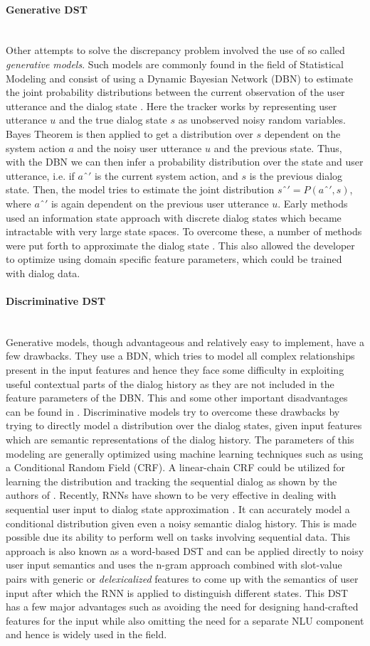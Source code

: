 \documentclass[12pt]{extarticle}
\newcommand{\myparagraph}[1]{\paragraph{#1}\mbox{}\\ \linebreak}
\numberwithin{equation}{section}
\begin{document}
	\myparagraph{Generative DST}
	Other attempts to solve the discrepancy problem involved the use of so called \textit{generative models}. Such models are commonly found in the field of Statistical Modeling and consist of using a Dynamic Bayesian Network (DBN) to estimate the joint probability distributions between the current observation of the user utterance and the dialog state \cite{Young_dst_dbn}. Here the tracker works by representing user utterance $u$ and the true dialog state $s$ as unobserved noisy random variables. Bayes Theorem is then applied to get a distribution over $s$ dependent on the system action $a$ and the noisy user utterance $u$ and the previous state. Thus, with the DBN we can then infer a probability distribution over the state and user utterance, i.e. if $aˆ'$ is the current system action, and $s$ is the previous dialog state. Then, the model tries to estimate the joint distribution $sˆ' = P(aˆ',s)$, where $aˆ'$ is again dependent on the previous user utterance $u$. Early methods used an information state approach with discrete dialog states\cite{roy2000spoken} which became intractable with very large state spaces. To overcome these, a number of methods were put forth to approximate the dialog state \cite{Henderson:2008:MMP:1557690.1557710}\cite{Young:2010:HIS:1621140.1621240}. This also allowed the developer to optimize using domain specific feature parameters, which could be trained with dialog data.
	\myparagraph{Discriminative DST}	
	Generative models, though advantageous and relatively easy to implement, have a few drawbacks.  They use a BDN, which tries to model all complex relationships present in the input features and hence they face some difficulty in exploiting useful contextual parts of the dialog history as they are not included in the feature parameters of the DBN. This and some other important disadvantages can be found in \cite{generative_dst_limitation}. Discriminative models try to overcome these drawbacks by trying to directly model a distribution over the dialog states, given input features which are semantic representations of the dialog history. The parameters of this modeling are generally optimized using machine learning techniques such as using a Conditional Random Field (CRF). A linear-chain CRF could be utilized for learning the distribution and tracking the sequential dialog as shown by the authors of \cite{Lee2013StructuredDM}. Recently, RNNs have shown to be very effective in dealing with sequential user input to dialog state approximation \cite{Henderson2014WordBasedDS}\cite{Henderson_dst_2014}. It can accurately model a conditional distribution given even a noisy semantic dialog history. This is made possible due its ability to perform well on tasks involving sequential data. This approach is also known as a word-based DST and can be applied directly to noisy user input semantics and uses the n-gram approach combined with slot-value pairs with generic or \textit{delexicalized} features to come up with the semantics of user input after which the RNN is applied to distinguish different states\cite{DBLP:journals/corr/MrksicSWTY16}. This DST has a few major advantages such as avoiding the need for designing hand-crafted features for the input while also omitting the need for a separate NLU component and hence is widely used in the field.
\end{document}
